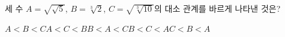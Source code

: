 세 수 $A=\sqrt{\sqrt{5}}$, $B=\sqrt[3]{2}$, $C=\sqrt{\sqrt[3]{10}}$의 대소 관계를 바르게 나타낸 것은?
\begin{choices32}{$A<B<C$}{$A<C<B$}{$B<A<C$}{$B<C<A$}{$C<B<A$}\end{choices32}
